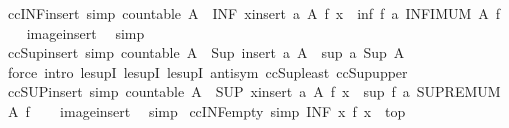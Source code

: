 \begin{isabellebody}
\endisatagproof
{\isafoldproof}%
%
\isadelimproof
\isanewline
%
\endisadelimproof
\isanewline
{}\isamarkupfalse%
\ ccINF{\isacharunderscore}insert\ {\isacharbrackleft}simp{\isacharbrackright}{\isacharcolon}\ {\isachardoublequoteopen}countable\ A\ {\isasymLongrightarrow}\ {\isacharparenleft}INF\ x{\isacharcolon}insert\ a\ A{\isachardot}\ f\ x{\isacharparenright}\ {\isacharequal}\ inf\ {\isacharparenleft}f\ a{\isacharparenright}\ {\isacharparenleft}INFIMUM\ A\ f{\isacharparenright}{\isachardoublequoteclose}\isanewline
%
\isadelimproof
\ \ %
\endisadelimproof
%
\isatagproof
{}\isamarkupfalse%
\ image{\isacharunderscore}insert\ \isamarkupfalse%
\ simp%
\endisatagproof
{\isafoldproof}%
%
\isadelimproof
\isanewline
%
\endisadelimproof
\isanewline
{}\isamarkupfalse%
\ ccSup{\isacharunderscore}insert\ {\isacharbrackleft}simp{\isacharbrackright}{\isacharcolon}\ {\isachardoublequoteopen}countable\ A\ {\isasymLongrightarrow}\ Sup\ {\isacharparenleft}insert\ a\ A{\isacharparenright}\ {\isacharequal}\ sup\ a\ {\isacharparenleft}Sup\ A{\isacharparenright}{\isachardoublequoteclose}\isanewline
%
\isadelimproof
\ \ %
\endisadelimproof
%
\isatagproof
{}\isamarkupfalse%
\ {\isacharparenleft}force\ intro{\isacharcolon}\ le{\isacharunderscore}supI\ le{\isacharunderscore}supI{}\ le{\isacharunderscore}supI{}\ antisym\ ccSup{\isacharunderscore}least\ ccSup{\isacharunderscore}upper{\isacharparenright}%
\endisatagproof
{\isafoldproof}%
%
\isadelimproof
\isanewline
%
\endisadelimproof
\isanewline
{}\isamarkupfalse%
\ ccSUP{\isacharunderscore}insert\ {\isacharbrackleft}simp{\isacharbrackright}{\isacharcolon}\ {\isachardoublequoteopen}countable\ A\ {\isasymLongrightarrow}\ {\isacharparenleft}SUP\ x{\isacharcolon}insert\ a\ A{\isachardot}\ f\ x{\isacharparenright}\ {\isacharequal}\ sup\ {\isacharparenleft}f\ a{\isacharparenright}\ {\isacharparenleft}SUPREMUM\ A\ f{\isacharparenright}{\isachardoublequoteclose}\isanewline
%
\isadelimproof
\ \ %
\endisadelimproof
%
\isatagproof
{}\isamarkupfalse%
\ image{\isacharunderscore}insert\ \isamarkupfalse%
\ simp%
\endisatagproof
{\isafoldproof}%
%
\isadelimproof
\isanewline
%
\endisadelimproof
\isanewline
{}\isamarkupfalse%
\ ccINF{\isacharunderscore}empty\ {\isacharbrackleft}simp{\isacharbrackright}{\isacharcolon}\ {\isachardoublequoteopen}{\isacharparenleft}INF\ x{\isacharcolon}{\isacharbraceleft}{\isacharbraceright}{\isachardot}\ f\ x{\isacharparenright}\ {\isacharequal}\ top{\isachardoublequoteclose}\isanewline

\end{isabellebody}
